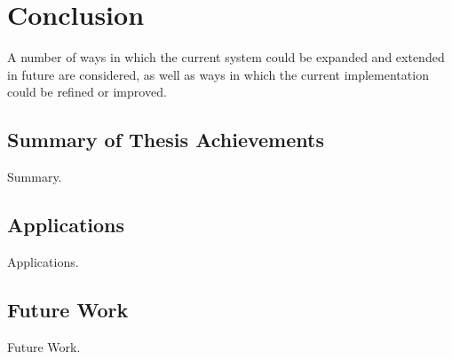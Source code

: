 
\chapter{Conclusion}

\label{ch:conclusions}

A number of ways in which the current system could be expanded and extended in future are considered, as well as ways in which the current implementation could be refined or improved.

\section{Summary of Thesis Achievements}

Summary.


\section{Applications}

Applications.


\section{Future Work}

Future Work.

